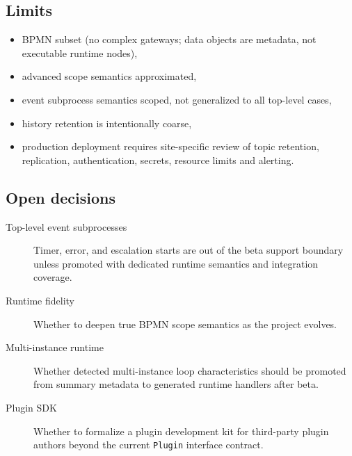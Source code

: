 \subsection{Limits}

\begin{itemize}
\item BPMN subset (no complex gateways; data objects are metadata, not executable runtime nodes),
\item advanced scope semantics approximated,
\item event subprocess semantics scoped, not generalized to all top-level cases,
\item history retention is intentionally coarse,
\item production deployment requires site-specific review of topic retention,
  replication, authentication, secrets, resource limits and alerting.
\end{itemize}

\subsection{Open decisions}

\begin{description}
\item[Top-level event subprocesses] Timer, error, and escalation starts are
  out of the beta support boundary unless promoted with dedicated runtime
  semantics and integration coverage.
\item[Runtime fidelity] Whether to deepen true BPMN scope semantics as the
  project evolves.
\item[Multi-instance runtime] Whether detected multi-instance loop
  characteristics should be promoted from summary metadata to generated runtime
  handlers after beta.
\item[Plugin SDK] Whether to formalize a plugin development kit for third-party
  plugin authors beyond the current \texttt{Plugin} interface contract.
\end{description}
